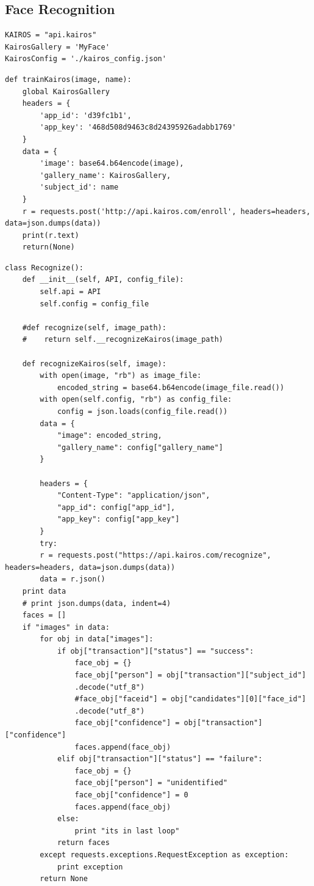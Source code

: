\documentclass[sigconf]{acmart}
\begin{document}
\subsection{Face Recognition}
\begin{lstlisting}
KAIROS = "api.kairos"
KairosGallery = 'MyFace'
KairosConfig = './kairos_config.json'
\end{lstlisting}

\begin{lstlisting}
def trainKairos(image, name):
    global KairosGallery
    headers = {
        'app_id': 'd39fc1b1',
        'app_key': '468d508d9463c8d24395926adabb1769'
    }
    data = {
        'image': base64.b64encode(image),
        'gallery_name': KairosGallery,
        'subject_id': name
    }
    r = requests.post('http://api.kairos.com/enroll', headers=headers, data=json.dumps(data))
    print(r.text)
    return(None)
\end{lstlisting}

\begin{lstlisting}
class Recognize():
    def __init__(self, API, config_file):
        self.api = API
        self.config = config_file

    #def recognize(self, image_path):
    #    return self.__recognizeKairos(image_path)
    
    def recognizeKairos(self, image):
        with open(image, "rb") as image_file:
            encoded_string = base64.b64encode(image_file.read())
        with open(self.config, "rb") as config_file:
            config = json.loads(config_file.read())
        data = {
            "image": encoded_string,
            "gallery_name": config["gallery_name"]
        }

        headers = {
            "Content-Type": "application/json",
            "app_id": config["app_id"],
            "app_key": config["app_key"]
        }
        try:
        r = requests.post("https://api.kairos.com/recognize", headers=headers, data=json.dumps(data))
        data = r.json()
    print data
    # print json.dumps(data, indent=4)
    faces = []
    if "images" in data:
        for obj in data["images"]:
            if obj["transaction"]["status"] == "success":
                face_obj = {}
                face_obj["person"] = obj["transaction"]["subject_id"]
                .decode("utf_8")
                #face_obj["faceid"] = obj["candidates"][0]["face_id"]
                .decode("utf_8")
                face_obj["confidence"] = obj["transaction"]["confidence"]
                faces.append(face_obj)
            elif obj["transaction"]["status"] == "failure":
                face_obj = {}
                face_obj["person"] = "unidentified"
                face_obj["confidence"] = 0
                faces.append(face_obj)
            else:
                print "its in last loop"
            return faces
        except requests.exceptions.RequestException as exception:
            print exception
        return None
\end{lstlisting}    
\end{document}
